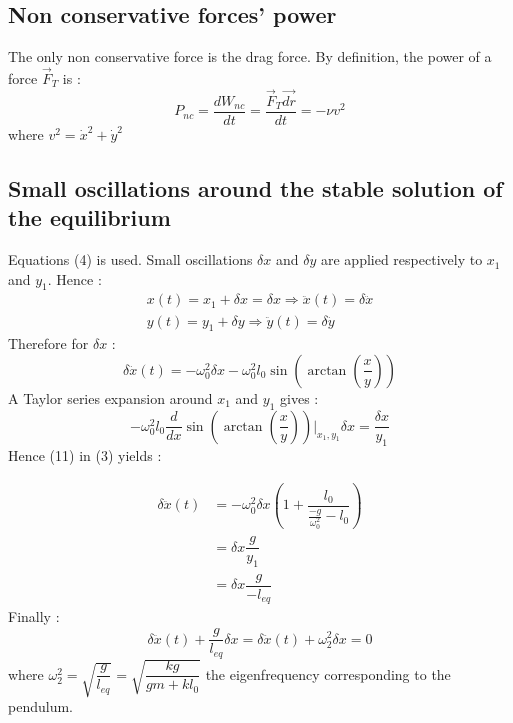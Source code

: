 \subsection{Non conservative forces' power}
	The only non conservative force is the drag force. By definition, the 			power of a force $\vec{F}_T$ is : 
	\begin{equation}
	P_{nc}=\dfrac{dW_{nc}}{dt} =\dfrac{\vec{F}_T\vec{dr}}{dt}=-\nu v^2
	\end{equation}
	where $v^2=\dot{x}^2 + \dot{y}^2$
\subsection{Small oscillations around the stable solution of the equilibrium}
	Equations (4) is used. Small oscillations $\delta x$ and $\delta y$ are 		applied respectively to $x_1$ and $y_1$. Hence : 
	\begin{gather}
	x(t)=x_1 + \delta x=\delta x \Rightarrow \ddot{x}(t)=\delta\ddot{x}\\
	y(t)=y_1 + \delta y \Rightarrow \ddot{y}(t)=\delta\ddot{y}
	\end{gather}
	Therefore for $\delta x$ : 
	\begin{equation}
	\delta\ddot{x}(t)=-\omega_0^2\delta x - \omega_0^2l_0\sin\left(\arctan\left(\dfrac{x}{y}\right)\right)
	\end{equation}
	A Taylor series expansion around  $x_1$ and $y_1$ gives : 
	\begin{equation}
	-\omega_0^2l_0\frac{d}{dx}\sin\left(\arctan\left(\dfrac{x}{y}\right)\right)\bigg\rvert_{x_1,y_1}\delta x = \frac{\delta x}{y_1}
	\end{equation}
	Hence (11) in (3) yields : 

	\begin{align*}
	\delta\ddot{x}(t)&=-\omega_0^2\delta x\left(1+\dfrac{l_0}{\frac{-g}{\omega_0^2}-l_0}\right)\\
	&=\delta x \dfrac{g}{y_1}\\
	&=\delta x \dfrac{g}{-l_{eq}}
	\end{align*}
	Finally : 
	\begin{equation}
	\delta \ddot{x}(t)+\dfrac{g}{l_{eq}}\delta x=\delta \ddot{x}(t)+\omega_2^2\delta x=0
	\end{equation}
	where $\omega_2^2=\sqrt{\dfrac{g}{l_{eq}}}=\sqrt{\dfrac{kg}{gm+kl_0}}$ the eigenfrequency corresponding to the pendulum. \\ \\
	

